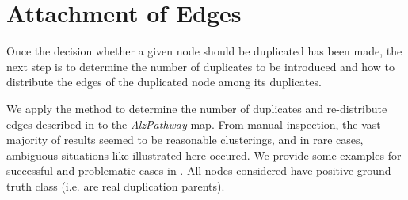 \documentclass[
	fontsize=10pt, %
	twoside=true, %
	secnumdepth=1, %
  toc=indentunnumbered %
]{kaobook}
\begin{document}
\section{Attachment of Edges}

Once the decision whether a given node should be duplicated has been made, the
next step is to determine the number of duplicates to be introduced and how to
distribute the edges of the duplicated node among its duplicates. 




We apply the method to determine the number of duplicates and re-distribute
edges described in  to the \textit{AlzPathway} map. From
manual inspection, the vast majority of results seemed to be reasonable
clusterings, and in rare cases, ambiguous situations like illustrated here
occured. We provide some examples for successful and problematic cases in
. All nodes considered have positive ground-truth
class (i.e. are real duplication parents).


\end{document}
